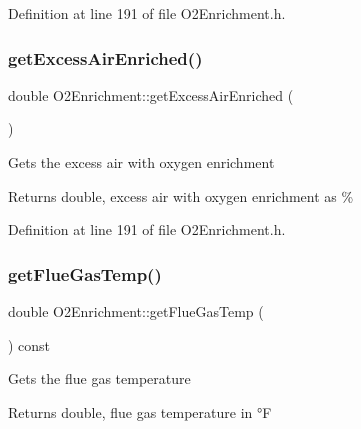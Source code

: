 Definition at line 191 of file O2\+Enrichment.\+h.

\mbox{\label{class_o2_enrichment_ad6e95234bd10eafb98a741e1bd75be58}} 
\subsubsection{\texorpdfstring{get\+Excess\+Air\+Enriched()}{getExcessAirEnriched()}\hspace{0.1cm}{\footnotesize\ttfamily [3/3]}}
{\footnotesize\ttfamily double O2\+Enrichment\+::get\+Excess\+Air\+Enriched (\begin{DoxyParamCaption}{ }\end{DoxyParamCaption})\hspace{0.3cm}{\ttfamily [inline]}}

Gets the excess air with oxygen enrichment \begin{DoxyReturn}{Returns}
double, excess air with oxygen enrichment as \% 
\end{DoxyReturn}


Definition at line 191 of file O2\+Enrichment.\+h.

\mbox{\label{class_o2_enrichment_a53083756c50aaf89f755a132b62e999b}} 
\subsubsection{\texorpdfstring{get\+Flue\+Gas\+Temp()}{getFlueGasTemp()}\hspace{0.1cm}{\footnotesize\ttfamily [1/3]}}
{\footnotesize\ttfamily double O2\+Enrichment\+::get\+Flue\+Gas\+Temp (\begin{DoxyParamCaption}{ }\end{DoxyParamCaption}) const\hspace{0.3cm}{\ttfamily [inline]}}

Gets the flue gas temperature \begin{DoxyReturn}{Returns}
double, flue gas temperature in °F 
\end{DoxyReturn}


